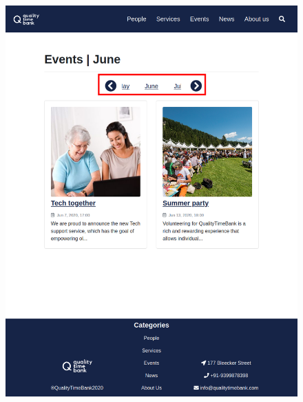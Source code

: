 \documentclass[a4paper, 11pt, parskip=half, headsepline]{scrreprt}
\begin{document}
\begin{figure}[H]
\begin{minipage}[t]{0.5\textwidth}
    	\includegraphics[width=1\linewidth, keepaspectratio]{scenarios/scenario-22}
    	\caption{}
    	\label{fig:scenario-22}
    \end{minipage}
\end{figure}
\end{document}
